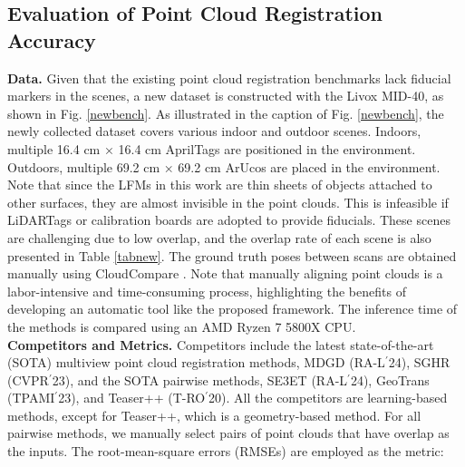 \subsection{Evaluation of Point Cloud Registration Accuracy} \label{test1}
\noindent\textbf{Data.} Given that the existing point cloud registration benchmarks \cite{3dmatch,eth,scan} lack fiducial markers in the scenes, a new dataset is constructed with the Livox MID-40, as shown in Fig. \ref{newbench}. As illustrated in the caption of Fig. \ref{newbench}, the newly collected dataset covers various indoor and outdoor scenes. Indoors, multiple 16.4 cm × 16.4 cm AprilTags \cite{ap3} are positioned in the environment. Outdoors, multiple 69.2 cm × 69.2 cm ArUcos \cite{aruco} are placed in the environment. Note that since the LFMs in this work are thin sheets of objects attached to other surfaces, they are almost invisible in the point clouds. This is infeasible if LiDARTags \cite{lt} or calibration boards \cite{cal,cal2,a4} are adopted to provide fiducials. These scenes are challenging due to low overlap, and the overlap rate \cite{pre} of each scene is also presented in Table \ref{tabnew}. The ground truth poses between scans are obtained manually using CloudCompare \cite{cloudcompare}. Note that manually aligning point clouds is a labor-intensive and time-consuming process, highlighting the benefits of developing an automatic tool like the proposed framework. The inference time of the methods is compared using an AMD Ryzen 7 5800X CPU.\\
\noindent\textbf{Competitors and Metrics.}
Competitors include the latest state-of-the-art (SOTA) multiview point cloud registration methods, MDGD \cite{mdgd} (RA-L$^{\prime}$24), SGHR \cite{sghr} (CVPR$^{\prime}$23), and the SOTA pairwise methods, SE3ET \cite{se3et} (RA-L$^{\prime}$24), GeoTrans \cite{geotransformer} (TPAMI$^{\prime}$23), and Teaser++ \cite{teaser} (T-RO$^{\prime}$20). All the competitors are learning-based methods, except for Teaser++, which is a geometry-based method. For all pairwise methods, we manually select pairs of point clouds that have overlap as the inputs.
%
The root-mean-square errors (RMSEs) \cite{shuo} are employed as the metric: 

